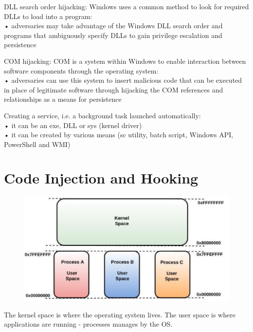 \documentclass[]{project_plan}
\begin{document}
DLL search order hijacking: Windows uses a common method to look for required DLLs to
load into a program:\\
• adversaries may take advantage of the Windows DLL search order and programs that ambiguously specify
DLLs to gain privilege escalation and persistence

COM hijacking: COM is a system within Windows to enable interaction between software
components through the operating system:\\
• adversaries can use this system to insert malicious code that can be executed in place of legitimate software
through hijacking the COM references and relationships as a means for persistence

Creating a service, i.e. a background task launched automatically:\\
• it can be an exe, DLL or sys (kernel driver)\\
• it can be created by various means (sc utility, batch script, Windows API, PowerShell and WMI)

\section{Code Injection and Hooking}

\begin{figure}[H]
  \centering
  \includegraphics[width=\linewidth]{process memory.png}
\end{figure}

The kernel space is where the operating system lives. The user space is where
applications are running - processes manages by the OS.
\end{document}
